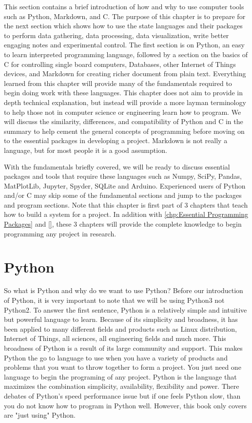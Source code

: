 \documentclass[11pt,a4paper]{book}
\begin{document}
	This section contains a brief introduction of how and why to use computer tools such as Python, Markdown, and C. The purpose of this chapter is to prepare for the next section which shows how to use the state languages and their packages to perform data gathering, data processing, data visualization, write better engaging notes and experimental control. The first section is on Python, an easy to learn interpreted programming language, followed by a section on the basics of C for controlling single board computers, Databases, other Internet of Things devices, and Markdown for creating richer document from plain text. Everything learned from this chapter will provide many of the fundamentals required to begin doing work with these languages. This chapter does not aim to provide in depth technical explanation, but instead will provide a more layman terminology to help those not in computer science or engineering learn how to program. We will discuss the similarity, differences, and compatibility of Python and C in the summary to help cement the general concepts of programming before moving on to the essential packages in developing a project. Markdown is not really a language, but for most people it is a good assumption. 
	
	With the fundamentals briefly covered, we will be ready to discuss essential packages and tools that require these languages such as Numpy, SciPy, Pandas, MatPlotLib, Jupyter, Spyder, SQLite and Arduino. Experienced users of Python and/or C may skip some of the fundamental sections and jump to the packages and program sections. Note that this chapter is first part of 3 chapters that teach how to build a system for a project. In addition with \autoref{chp:Essential Programming Packages} and \autoref{}, these 3 chapters will provide the complete knowledge to begin programming any project in research.
	
	\section{Python}
		\label{sec:Python}
		So what is Python and why do we want to use Python? Before our introduction of Python, it is very important to note that we will be using Python3 not Python2. To answer the first sentence, Python is a relatively simple and intuitive but powerful language to learn. Because of its simplicity and broadness, it has been applied to many different fields and products such as Linux distribution, Internet of Things, all sciences, all engineering fields and much more. This broadness of Python is a result of its large community and support. This makes Python the go to language to use when you have a variety of products and problems that you want to throw together to form a project. You just need one language to begin the programing of any project. Python is the language that maximizes the combination simplicity, availability, flexibility and power. There debates of Python's speed performance issue but if one feels Python slow, than you do not know how to program in Python well. However, this book only covers are "just using" Python. 
		
\end{document}
